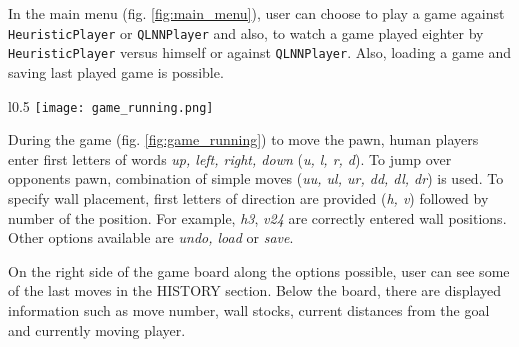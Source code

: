 In the main menu (fig. \ref{fig:main_menu}), user can choose to play a game
against {\lstinline{HeuristicPlayer}} or {\lstinline{QLNNPlayer}} and also,
to watch a game played eighter by {\lstinline{HeuristicPlayer}} versus himself
or against {\lstinline{QLNNPlayer}}. Also, loading a game and saving last
played game is possible.

\begin{wrapfigure}{l}{0.5\textwidth}
  \vspace*{-0.35cm}
  \centering
  \texttt{[image: game\_running.png]}
  \vspace*{-0.30cm}
  \caption{game running}
  \label{fig:game_running}
  \vspace*{-0.60cm}
\end{wrapfigure}

During the game (fig. \ref{fig:game_running}) to move the pawn, human players
enter first letters of words \textit{up, left, right, down}
(\textit{u, l, r, d}). To jump over opponents pawn, combination of simple
moves (\textit{uu, ul, ur, dd, dl, dr}) is used. To specify wall placement,
first letters of direction are provided (\textit{h, v}) followed by number
of the position.  For example, \textit{h3}, \textit{v24} are correctly entered
wall positions. Other options available are \textit{undo, load} or
\textit{save}.

On the right side of the game board along the options possible, user can see
some of the last moves in the HISTORY section. Below the board, there are
displayed information such as move number, wall stocks, current distances from
the goal and currently moving player.


% 
% 

